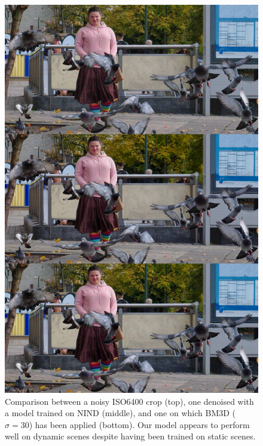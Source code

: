 \begin{figure}[!htbp]
\centering
\includegraphics[width=1\linewidth]{gfx/comp/comp-noisy-nind-bm3d30.jpg}
\caption[Denoising of an unpaired ``high-speed'' image (visual comparison)]{Comparison between a noisy ISO6400 crop (top), one denoised with a model trained on \ac{NIND} (middle), and one on which \ac{BM3D} ($\sigma=30$) has been applied (bottom). Our model appears to perform well on dynamic scenes despite having been trained on static scenes.}
\label{fig:visualpigeons}
\end{figure}

